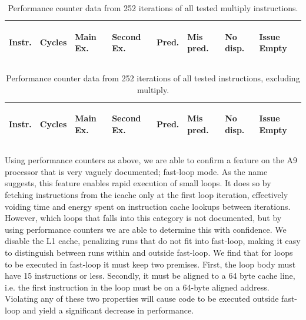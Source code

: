 \begin{table}
    \centering
    \begin{tabular}{|p{0.7cm}|R{0.8cm}R{0.6cm}R{0.9cm}R{0.6cm}R{0.6cm}R{0.8cm}R{0.8cm}|}
        \hline
        \centering
        Instr. &
        \centering
        Cycles &
        \centering
        Main Ex. &
        \centering
        Second Ex. &
        \centering
        Pred. &
        \centering
        Mis pred. &
        \centering
        No disp. &
        \begin{centering}
        Issue Empty
        \end{centering}
        \\
        \hline
        
        \hline
    \end{tabular}
    \caption{Performance counter data from 252 iterations of all tested multiply
    instructions.}
    \label{tab:perf_mul}
\end{table}

\begin{table}
    \centering
    \begin{tabular}{|p{0.7cm}|R{0.8cm}R{0.6cm}R{0.9cm}R{0.6cm}R{0.6cm}R{0.8cm}R{0.8cm}|}
        \hline
        \centering
        Instr. &
        \centering
        Cycles &
        \centering
        Main Ex. &
        \centering
        Second Ex. &
        \centering
        Pred. &
        \centering
        Mis pred. &
        \centering
        No disp. &
        \begin{centering}
        Issue Empty
        \end{centering}
        \\
        \hline
        
        \hline
    \end{tabular}
    \caption{Performance counter data from 252 iterations of all tested
    instructions, excluding multiply.}
    \label{tab:perf_nonmul}
\end{table}


Using performance counters as above, we are able to confirm a feature on the A9
processor that is very vaguely documented; fast-loop\texttrademark{} mode. As
the name suggests, this feature enables rapid execution of small loops. It does
so by fetching instructions from the icache only at the first loop iteration,
effectively voiding time and energy spent on instruction cache lookups between
iterations. However, which loops that falls into this category is not
documented, but by using performance counters we are able to determine this with
confidence. We disable the L1 cache, penalizing runs that do not fit into
fast-loop, making it easy to distinguish between runs within and outside
fast-loop. We find that for loops to be executed in fast-loop it must keep two
premises. First, the loop body must have 15 instructions or less. Secondly, it
must be aligned to a 64 byte cache line, i.e. the first instruction in the loop
must be on a 64-byte aligned address. Violating any of these two properties
will cause code to be executed outside fast-loop and yield a significant
decrease in performance.

